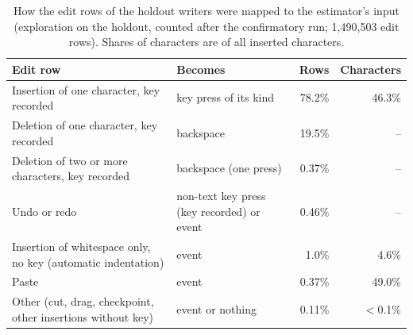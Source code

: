 \begin{table}[h]
  \caption{How the edit rows of the holdout writers were mapped to the estimator's input (exploration on the holdout,
  counted after the confirmatory run; 1,490,503 edit rows). Shares of characters are of all inserted characters.}
  \label{tab:mapping}
  \centering\small
  \begin{tabularx}{\linewidth}{>{\raggedright\arraybackslash}X >{\raggedright\arraybackslash}p{2.9cm} r r}
    \toprule
    Edit row & Becomes & Rows & Characters \\
    \midrule
    Insertion of one character, key recorded & key press of its kind & 78.2\% & 46.3\% \\
    Deletion of one character, key recorded & backspace & 19.5\% & -- \\
    Deletion of two or more characters, key recorded & backspace (one press) & 0.37\% & -- \\
    Undo or redo & non-text key press (key recorded) or event & 0.46\% & -- \\
    Insertion of whitespace only, no key (automatic indentation) & event & 1.0\% & 4.6\% \\
    Paste & event & 0.37\% & 49.0\% \\
    Other (cut, drag, checkpoint, other insertions without key) & event or nothing & 0.11\% & $<$0.1\% \\
    \bottomrule
  \end{tabularx}
\end{table}

